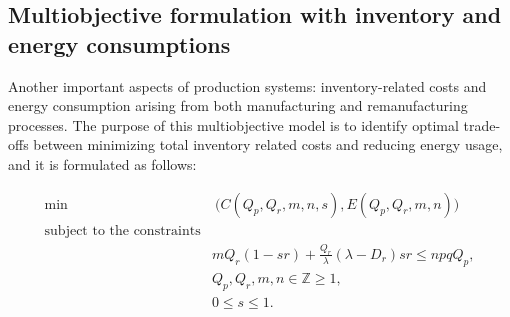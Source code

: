 \documentclass[11pt]{article}
\newcommand{\ds}{\displaystyle}
\begin{document}
\subsection{Multiobjective formulation with inventory and energy consumptions}
\noindent 
Another important aspects of production systems: inventory-related costs and energy consumption arising from both manufacturing and remanufacturing processes. The purpose of this multiobjective model is to identify optimal trade-offs between minimizing total inventory related costs and reducing energy usage, and it is formulated as follows:


\begin{equation}\label{modelmop2}
\begin{array}{rl} 
\min & \ \bigg ( C(Q_p, Q_r, m, n, s), E(Q_p, Q_r, m, n) \bigg )\\
\mbox{subject to the constraints} \\
& \ds mQ_r(1 - sr) + \frac{Q_r}{\lambda} (\lambda - D_r)sr \leq  npqQ_p, \\ 
&\ds Q_p, Q_r, m, n \in {\mathbb{Z} \geq 1},\\
& \ds 0 \leq s \leq 1.
\end{array}
\end{equation}
\end{document}
